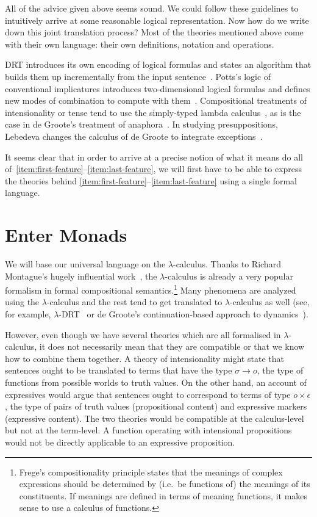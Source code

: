 All of the advice given above seems sound. We could follow these guidelines
to intuitively arrive at some reasonable logical representation. Now how do
we write down this joint translation process? Most of the theories
mentioned above come with their own language: their own definitions,
notation and operations.

DRT introduces its own encoding of logical formulas and states an algorithm
that builds them up incrementally from the input
sentence~\cite{kamp1993discourse}. Potts's logic of conventional
implicatures introduces two-dimensional logical formulas and defines new
modes of combination to compute with
them~\cite{potts2005logic}. Compositional treatments of intensionality or
tense tend to use the simply-typed lambda
calculus~\cite{ben2007semantics,de2013note}, as is the case in de Groote's
treatment of anaphora~\cite{de2006towards}. In studying presuppositions,
Lebedeva changes the calculus of de Groote to integrate
exceptions~\cite{lebedeva2012expression}.

It seems clear that in order to arrive at a precise notion of what it means
do all of~\ref{item:first-feature}--\ref{item:last-feature}, we will first
have to be able to express the theories behind
\ref{item:first-feature}--\ref{item:last-feature} using a single formal
language.

\section*{Enter Monads}

We will base our universal language on the $\lambda$-calculus. Thanks to
Richard Montague's hugely influential work~\cite{montague1973proper}, the
$\lambda$-calculus is already a very popular formalism in formal
compositional semantics.\footnote{Frege's compositionality principle states
  that the meanings of complex expressions should be determined by (i.e.\
  be functions of) the meanings of its constituents. If meanings are
  defined in terms of meaning functions, it makes sense to use a calculus
  of functions.} Many phenomena are analyzed using the $\lambda$-calculus
and the rest tend to get translated to $\lambda$-calculus as well (see, for
example, $\lambda$-DRT~\cite{kuschert1995type} or de Groote's
continuation-based approach to dynamics~\cite{de2006towards}).

However, even though we have several theories which are all formalised in
$\lambda$-calculus, it does not necessarily mean that they are compatible
or that we know how to combine them together. A theory of intensionality
might state that sentences ought to be translated to terms that have the
type $\sigma \to o$, the type of functions from possible worlds to truth
values. On the other hand, an account of expressives would argue that
sentences ought to correspond to terms of type $o \times \epsilon$, the
type of pairs of truth values (propositional content) and expressive
markers (expressive content). The two theories would be compatible at the
calculus-level but not at the term-level. A function operating with
intensional propositions would not be directly applicable to an expressive
proposition.

